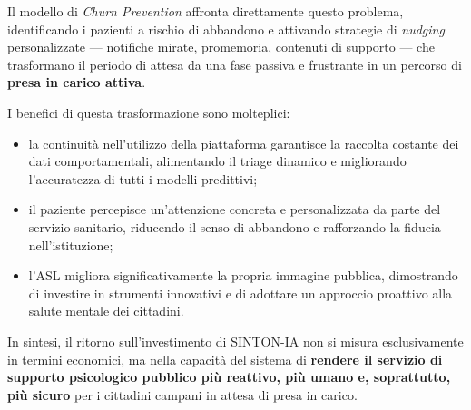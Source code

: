 Il modello di \textit{Churn Prevention} affronta direttamente questo problema, identificando i pazienti a rischio di abbandono e attivando strategie di \textit{nudging} personalizzate --- notifiche mirate, promemoria, contenuti di supporto --- che trasformano il periodo di attesa da una fase passiva e frustrante in un percorso di \textbf{presa in carico attiva}.

I benefici di questa trasformazione sono molteplici:
\begin{itemize}
    \item la continuità nell'utilizzo della piattaforma garantisce la raccolta costante dei dati comportamentali, alimentando il triage dinamico e migliorando l'accuratezza di tutti i modelli predittivi;
    \item il paziente percepisce un'attenzione concreta e personalizzata da parte del servizio sanitario, riducendo il senso di abbandono e rafforzando la fiducia nell'istituzione;
    \item l'ASL migliora significativamente la propria immagine pubblica, dimostrando di investire in strumenti innovativi e di adottare un approccio proattivo alla salute mentale dei cittadini.
\end{itemize}

In sintesi, il ritorno sull'investimento di SINTON-IA non si misura esclusivamente in termini economici, ma nella capacità del sistema di \textbf{rendere il servizio di supporto psicologico pubblico più reattivo, più umano e, soprattutto, più sicuro} per i cittadini campani in attesa di presa in carico.
